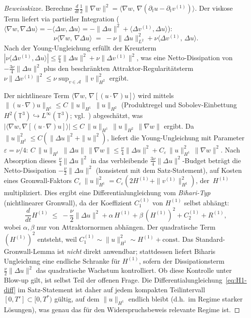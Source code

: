 \documentclass[12pt,a4paper]{article}
\theoremstyle{definition}
\theoremstyle{plain}
\theoremstyle{remark}
\begin{document}
\begin{proof}[Beweisskizze]
Berechne $\frac{d}{dt}\frac{1}{2}\|\nabla w\|^2
= \langle \nabla w,\,\nabla(\partial_t u - \partial_t v^{(1)})\rangle$.
Der viskose Term liefert via partieller Integration
($\langle \nabla w, \nabla\Delta u\rangle
= -\langle \Delta w, \Delta u\rangle
= -\|\Delta u\|^2 + \langle \Delta v^{(1)}, \Delta u\rangle$):
\[
  \nu\langle \nabla w,\, \nabla\Delta u \rangle
  \;=\; -\nu\|\Delta u\|_{L^2}^2
        + \nu\langle \Delta v^{(1)},\, \Delta u \rangle.
\]
Nach der Young-Ungleichung erfüllt der Kreuzterm
$|\nu\langle \Delta v^{(1)}, \Delta u\rangle|
\le \frac{\nu}{4}\|\Delta u\|^2 + \nu\|\Delta v^{(1)}\|^2$,
was eine Netto-Dissipation von $-\frac{3\nu}{4}\|\Delta u\|^2$
plus den beschränkten Attraktor-Regularitätsterm
$\nu\|\Delta v^{(1)}\|^2 \le \nu\sup_{v\in\mathcal{A}}\|v\|_{H^2}^2$ ergibt.

Der nichtlineare Term $\langle \nabla w,\, \nabla[(u\cdot\nabla)u]\rangle$
wird mittels
$\|(u\cdot\nabla)u\|_{H^1} \le C\,\|u\|_{H^1}\,\|u\|_{H^2}$
(Produktregel und Sobolev-Einbettung $H^2(\mathbb{T}^3) \hookrightarrow
L^\infty(\mathbb{T}^3)$; vgl.\ \cite{ConstantinFoias1988}) abgeschätzt, was
$|\langle \nabla w, \nabla[(u\cdot\nabla)u]\rangle|
\le C\,\|u\|_{H^1}\,\|u\|_{H^2}\,\|\nabla w\|$ ergibt.
Da $\|u\|_{H^2}^2 \le C(\|\Delta u\|^2 + \|u\|^2)$,
liefert die Young-Ungleichung mit Parameter $\varepsilon = \nu/4$:
$C\,\|u\|_{H^1}\,\|\Delta u\|\,\|\nabla w\|
\le \frac{\nu}{4}\|\Delta u\|^2
+ C_\varepsilon\,\|u\|_{H^1}^2\,\|\nabla w\|^2$.
Nach Absorption dieses $\frac{\nu}{4}\|\Delta u\|^2$ in das verbleibende
$\frac{3\nu}{4}\|\Delta u\|^2$-Budget beträgt die Netto-Dissipation
$-\frac{\nu}{2}\|\Delta u\|^2$ (konsistent mit dem Satz-Statement),
auf Kosten eines Gronwall-Faktors
$C_\varepsilon\,\|u\|_{H^1}^2 = C_\varepsilon(2H^{(1)}
+ \|v^{(1)}\|_{H^1}^2)$, der~$H^{(1)}$ multipliziert.
Dies ergibt eine Differentialungleichung vom \emph{Bihari-Typ}
(nichtlinearer Gronwall), da der Koeffizient $C_1^{(1)}$ von
$H^{(1)}$ selbst abhängt:
\[
  \frac{d}{dt}H^{(1)}
  \;\le\;
  -\frac{\nu}{2}\|\Delta u\|^2
  + \alpha\,H^{(1)}
  + \beta\,(H^{(1)})^2
  + C_2^{(1)}
  + R^{(1)},
\]
wobei $\alpha, \beta$ nur von Attraktornormen abhängen.
Der quadratische Term $(H^{(1)})^2$ entsteht, weil
$C_1^{(1)} \sim \|u\|_{H^1}^2 \sim H^{(1)} + \mathrm{const}$.
Das Standard-Gronwall-Lemma ist \emph{nicht} direkt anwendbar;
stattdessen liefert Biharis Ungleichung eine endliche Schranke für $H^{(1)}$,
sofern der Dissipationsterm $\frac{\nu}{2}\|\Delta u\|^2$
das quadratische Wachstum kontrolliert. Ob diese Kontrolle unter Blow-up
gilt, ist selbst Teil der offenen Frage. Die
Differentialungleichung~\eqref{eq:H1-diff} im Satz-Statement ist daher
auf jedem kompakten Teilintervall $[0,T'] \subset [0,T^*)$ gültig, auf dem
$\|u\|_{H^1}$ endlich bleibt (d.h.\ im Regime starker Lösungen), was
genau das für den Widerspruchsbeweis relevante Regime ist.


\end{proof}
\end{document}
